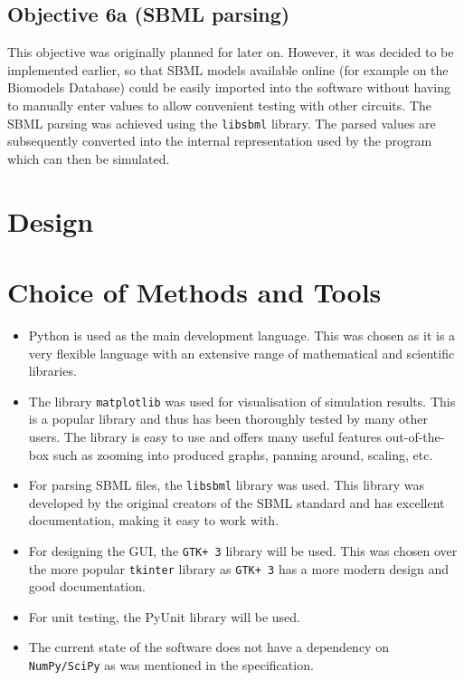 \documentclass{article}
\begin{document}
	\subsection{Objective 6a (SBML parsing)} 
	This objective was originally planned for later on. However, it was decided to be implemented earlier, so that SBML models available online (for example on the Biomodels Database) could be easily imported into the software without having to manually enter values to allow convenient testing with other circuits. The SBML parsing was achieved using the \verb|libsbml| library. The parsed values are subsequently converted into the internal representation used by the program which can then be simulated. 
	
	
	\section{Design}		%
	
	
	\section{Choice of Methods and Tools}
	
	\begin{itemize}
		\item Python is used as the main development language. This was chosen as it is a very flexible language with an extensive range of mathematical and scientific libraries.
		\item The library \verb|matplotlib| \cite{matplotlib} was used for visualisation of simulation results. This is a popular library and thus has been thoroughly tested by many other users. The library is easy to use and offers many useful features out-of-the-box such as zooming into produced graphs, panning around, scaling, etc.
		\item For parsing SBML files, the \verb|libsbml| library was used. This library was developed by the original creators of the SBML standard and has excellent documentation, making it easy to work with.
		\item For designing the GUI, the \verb|GTK+ 3| library will be used. This was chosen over the more popular \verb|tkinter| library as \verb|GTK+ 3| has a more modern design and good documentation.
		\item For unit testing, the PyUnit library will be used.
		\item The current state of the software does not have a dependency on \verb|NumPy/SciPy| \cite{numpy, scipy} as was mentioned in the specification.
	\end{itemize}
	
\end{document}
